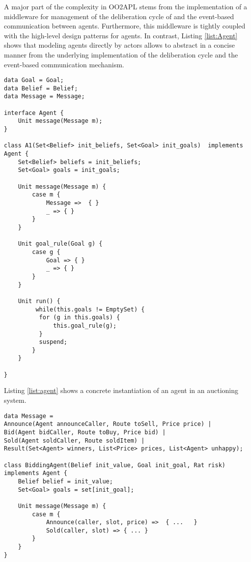 A major part of the complexity in OO2APL stems from the implementation of a middleware for management of the deliberation cycle of and the event-based communication between agents. 
Furthermore, this middleware is tightly coupled with the high-level design patterns for agents.
In contrast,  Listing \ref{list:Agent} shows that modeling agents directly by actors  allows to abstract in a concise manner from the underlying implementation of the deliberation cycle  and the event-based communication mechanism.



\begin{lstlisting}[caption= Generic Agent Model, label=list:Agent]
data Goal = Goal;
data Belief = Belief;
data Message = Message;

interface Agent {
	Unit message(Message m);
}

class A1(Set<Belief> init_beliefs, Set<Goal> init_goals)  implements Agent {
	Set<Belief> beliefs = init_beliefs;
	Set<Goal> goals = init_goals;
	
	Unit message(Message m) {
		case m { 
			Message =>  { }
			_ => { }
		}
	}
	
	Unit goal_rule(Goal g) {
		case g {
			Goal => { }
			_ => { }
		}
	}
	
	Unit run() {
		 while(this.goals != EmptySet) {
		  for (g in this.goals) {
		      this.goal_rule(g);
		  }
		  suspend;
		}
	}

}

\end{lstlisting}



Listing \ref{list:agent} shows a concrete instantiation of an agent  in an auctioning system.

\begin{lstlisting}[caption= Agent Model, label=list:agent]
data Message = 
Announce(Agent announceCaller, Route toSell, Price price) | 
Bid(Agent bidCaller, Route toBuy, Price bid) |
Sold(Agent soldCaller, Route soldItem) |
Result(Set<Agent> winners, List<Price> prices, List<Agent> unhappy);

class BiddingAgent(Belief init_value, Goal init_goal, Rat risk) implements Agent {
	Belief belief = init_value;
	Set<Goal> goals = set[init_goal];
	
	Unit message(Message m) {
		case m {
			Announce(caller, slot, price) =>  { ...   } 
		    Sold(caller, slot) => { ... }
		}
	}
}
\end{lstlisting}


